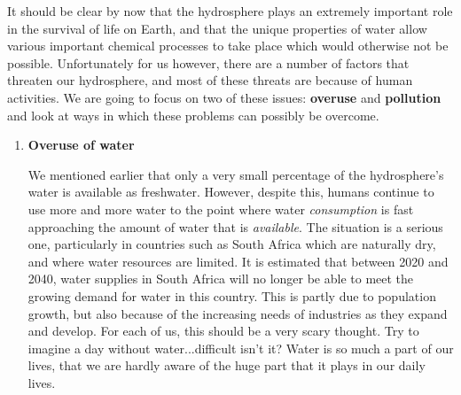 It should be clear by now that the hydrosphere plays an extremely important role in the survival of life on Earth, and that the unique properties of water allow various important chemical processes to take place which would otherwise not be possible. Unfortunately for us however, there are a number of factors that threaten our hydrosphere, and most of these threats are because of human activities. We are going to focus on two of these issues: \textbf{overuse} and \textbf{pollution} and look at ways in which these problems can possibly be overcome.

\begin{enumerate}
\item{\textbf{Overuse of water}

We mentioned earlier that only a very small percentage of the hydrosphere's water is available as freshwater. However, despite this, humans continue to use more and more water to the point where water \textit{consumption} is fast approaching the amount of water that is \textit{available}. The situation is a serious one, particularly in countries such as South Africa which are naturally dry, and where water resources are limited. It is estimated that between 2020 and 2040, water supplies in South Africa will no longer be able to meet the growing demand for water in this country. This is partly due to population growth, but also because of the increasing needs of industries as they expand and develop. For each of us, this should be a very scary thought. Try to imagine a day without water...difficult isn't it? Water is so much a part of our lives, that we are hardly aware of the huge part that it plays in our daily lives.}


\end{enumerate}
